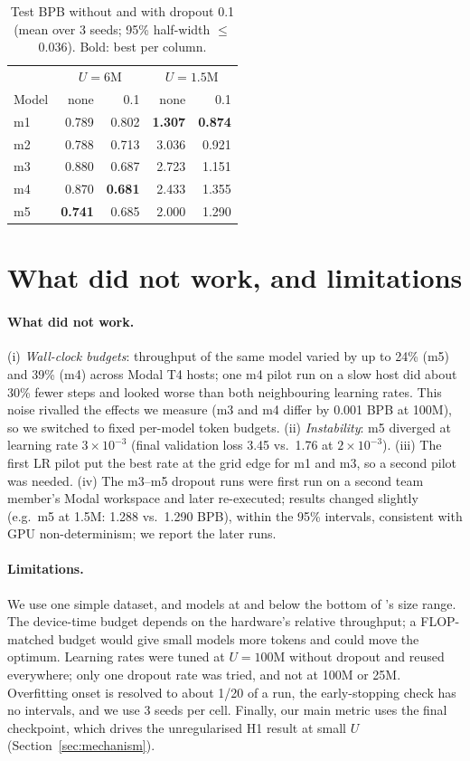 \documentclass[11pt]{article}
\begin{document}
\begin{table}[h]\centering\small
\caption{Test BPB without and with dropout 0.1 (mean over 3 seeds; 95\% half-width $\le$ 0.036).
Bold: best per column.}
\label{tab:dropout}
\begin{tabular}{lrrrr}\toprule
 & \multicolumn{2}{c}{$U=6$M} & \multicolumn{2}{c}{$U=1.5$M}\\
Model & none & 0.1 & none & 0.1\\\midrule
m1 & 0.789 & 0.802 & \textbf{1.307} & \textbf{0.874}\\
m2 & 0.788 & 0.713 & 3.036 & 0.921\\
m3 & 0.880 & 0.687 & 2.723 & 1.151\\
m4 & 0.870 & \textbf{0.681} & 2.433 & 1.355\\
m5 & \textbf{0.741} & 0.685 & 2.000 & 1.290\\\bottomrule
\end{tabular}\end{table}

\section{What did not work, and limitations}\label{sec:notwork}
\paragraph{What did not work.}
(i) \emph{Wall-clock budgets}: throughput of the same model varied by up to 24\% (m5) and 39\% (m4) across
Modal T4 hosts; one m4 pilot run on a slow host did about 30\% fewer steps and looked worse than both
neighbouring learning rates. This noise rivalled the effects we measure (m3 and m4 differ by 0.001 BPB at
100M), so we switched to fixed per-model token budgets. (ii) \emph{Instability}: m5 diverged at learning
rate $3\times10^{-3}$ (final validation loss 3.45 vs.\ 1.76 at $2\times10^{-3}$). (iii) The first LR pilot put
the best rate at the grid edge for m1 and m3, so a second pilot was needed. (iv) The m3--m5 dropout runs were first run
on a second team member's Modal workspace and later re-executed; results changed slightly (e.g.\ m5 at 1.5M: 1.288 vs.\ 1.290 BPB), 
within the 95\% intervals, consistent with GPU non-determinism; we report the later runs.

\paragraph{Limitations.}
We use one simple dataset, and models at and below the bottom of \citet{muennighoff2023scaling}’s size range. 
The device-time budget depends on the hardware's relative throughput; a FLOP-matched budget would give small models more tokens and could move the optimum. 
Learning rates were tuned at $U=100$M without dropout and reused everywhere; only one dropout rate was tried, and not at 100M or 25M.
Overfitting onset is resolved to about 1/20 of a run, the early-stopping check has no intervals, and we use
3 seeds per cell. Finally, our main metric uses the final checkpoint, which drives the unregularised H1 result
at small $U$ (Section~\ref{sec:mechanism}).
\end{document}

